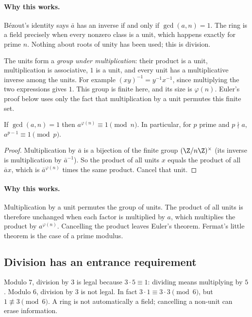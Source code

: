 \paragraph{Why this works.}
Bézout's identity says $\bar a$ has an inverse if and only if $\gcd(a,n)=1$. The ring is a field precisely when every nonzero class is a unit, which happens exactly for prime $n$. Nothing about roots of unity has been used; this is division.

The units form a \emph{group under multiplication}: their product is a unit, multiplication is associative, $1$ is a unit, and every unit has a multiplicative inverse among the units. For example $(xy)^{-1}=y^{-1}x^{-1}$, since multiplying the two expressions gives $1$. This group is finite here, and its size is $\varphi(n)$. Euler's proof below uses only the fact that multiplication by a unit permutes this finite set.

\begin{theorem}\label{thm:eulerthm}
If $\gcd(a,n)=1$ then $a^{\varphi(n)}\equiv1\pmod n$. In particular, for $p$ prime and $p\nmid a$, $a^{p-1}\equiv1\pmod p$.
\end{theorem}
\begin{proof}
Multiplication by $\bar a$ is a bijection of the finite group $(\Z/n\Z)^\times$ (its inverse is multiplication by $\bar a^{-1}$). So the product of all units $x$ equals the product of all $\bar ax$, which is $\bar a^{\varphi(n)}$ times the same product. Cancel that unit.
\end{proof}

\paragraph{Why this works.}
Multiplication by a unit permutes the group of units. The product of all units is therefore unchanged when each factor is multiplied by $a$, which multiplies the product by $a^{\varphi(n)}$. Cancelling the product leaves Euler's theorem. Fermat's little theorem is the case of a prime modulus.

\subsection*{Division has an entrance requirement}
Modulo $7$, division by $3$ is legal because $3\cdot5\equiv1$: dividing means multiplying by $5$. Modulo $6$, division by $3$ is not legal. In fact $3\cdot1\equiv3\cdot3\pmod6$, but $1\not\equiv3\pmod6$. A ring is not automatically a field; cancelling a non-unit can erase information.

